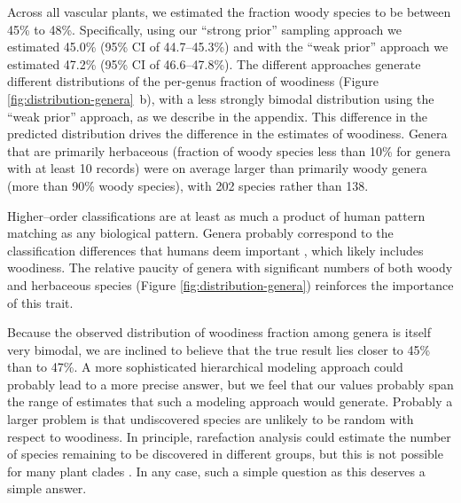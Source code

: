 \documentclass[12pt]{article}
\begin{document}


Across all vascular plants, we estimated the fraction woody species to
be between 45\% to 48\%.
Specifically, using our ``strong prior'' sampling approach we
estimated 45.0\% (95\% CI of 44.7--45.3\%) and with the ``weak prior''
approach we estimated 47.2\% (95\% CI of 46.6--47.8\%).  
% 
The different approaches generate different distributions of the
per-genus fraction of woodiness (Figure
\ref{fig:distribution-genera}~b), with a less strongly bimodal
distribution using the ``weak prior'' approach, as we describe in the
appendix.
%
This difference in the predicted distribution drives the difference in
the estimates of woodiness.  Genera that are primarily herbaceous
(fraction of woody species less than 10\% for genera with at least 10
records) were on average larger than primarily woody genera (more than
90\% woody species), with 202 species rather than 138.
%

Higher--order classifications are at least as much a product of human
pattern matching as any biological pattern.  Genera probably
correspond to the classification differences that humans deem
important \citep{scotland2004significance}, which likely includes woodiness.  
The relative paucity of genera with significant numbers of
both woody and herbaceous species (Figure
\ref{fig:distribution-genera}) reinforces the importance of this
trait.

Because the observed distribution of woodiness fraction among genera
is itself very bimodal, we are inclined to believe that the true
result lies closer to 45\% than to 47\%.  A more sophisticated
hierarchical modeling approach could probably lead to a more precise
answer, but we feel that our values probably span the range of
estimates that such a modeling approach would generate.  
%
Probably a larger problem is that undiscovered species are unlikely to
be random with respect to woodiness.  In principle, rarefaction
analysis could estimate the number of species remaining to be
discovered in different groups, but this is not possible for many
plant clades \citep{costello2011}.
%
In any case, such a simple question as this deserves a simple answer.
\end{document}
